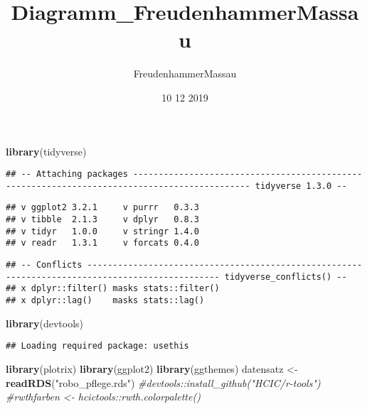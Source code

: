 \documentclass[]{article}
\title{Diagramm\_FreudenhammerMassau}
\author{FreudenhammerMassau}
\date{10 12 2019}
\newenvironment{Shaded}{\begin{snugshade}}{\end{snugshade}}
\newcommand{\CommentTok}[1]{\textcolor[rgb]{0.56,0.35,0.01}{\textit{#1}}}
\newcommand{\KeywordTok}[1]{\textcolor[rgb]{0.13,0.29,0.53}{\textbf{#1}}}
\newcommand{\NormalTok}[1]{#1}
\newcommand{\StringTok}[1]{\textcolor[rgb]{0.31,0.60,0.02}{#1}}
\begin{document}
\maketitle

\begin{Shaded}
\begin{Highlighting}[]
\KeywordTok{library}\NormalTok{(tidyverse)}
\end{Highlighting}
\end{Shaded}

\begin{verbatim}
## -- Attaching packages --------------------------------------------------------------------------------------------- tidyverse 1.3.0 --
\end{verbatim}

\begin{verbatim}
## v ggplot2 3.2.1     v purrr   0.3.3
## v tibble  2.1.3     v dplyr   0.8.3
## v tidyr   1.0.0     v stringr 1.4.0
## v readr   1.3.1     v forcats 0.4.0
\end{verbatim}

\begin{verbatim}
## -- Conflicts ------------------------------------------------------------------------------------------------ tidyverse_conflicts() --
## x dplyr::filter() masks stats::filter()
## x dplyr::lag()    masks stats::lag()
\end{verbatim}

\begin{Shaded}
\begin{Highlighting}[]
\KeywordTok{library}\NormalTok{(devtools)}
\end{Highlighting}
\end{Shaded}

\begin{verbatim}
## Loading required package: usethis
\end{verbatim}

\begin{Shaded}
\begin{Highlighting}[]
\KeywordTok{library}\NormalTok{(plotrix)}
\KeywordTok{library}\NormalTok{(ggplot2)}
\KeywordTok{library}\NormalTok{(ggthemes)}
\NormalTok{datensatz <-}\StringTok{ }\KeywordTok{readRDS}\NormalTok{(}\StringTok{"robo_pflege.rds"}\NormalTok{)}
\CommentTok{#devtools::install_github("HCIC/r-tools")}
\CommentTok{#rwthfarben <- hcictools::rwth.colorpalette()}
\end{Highlighting}
\end{Shaded}
\end{document}
